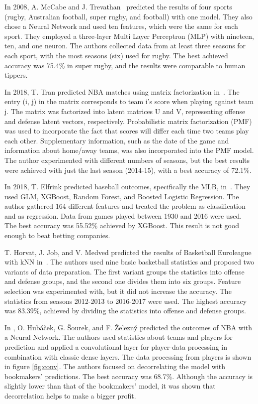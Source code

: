 \documentclass[thesis=M,english]{FITthesis}[2019/12/23]
\begin{document}
In 2008, A. McCabe and J. Trevathan~\cite{NN_more_sports} predicted the results of four sports (rugby, Australian football, super rugby, and football) with one model. They also chose a Neural Network and used ten features, which were the same for each sport. They employed a three-layer Multi Layer Perceptron (MLP) with nineteen, ten, and one neuron. The authors collected data from at least three seasons for each sport, with the most seasons (six) used for rugby. The best achieved accuracy was 75.4\% in super rugby, and the results were comparable to human tippers.

In 2018, T. Tran predicted NBA matches using matrix factorization in~\cite{NBA_matrix_factorization}. The entry (i, j) in the matrix corresponds to team i's score when playing against team j. The matrix was factorized into latent matrices U and V, representing offense and defense latent vectors, respectively. Probabilistic matrix factorization (PMF) was used to incorporate the fact that scores will differ each time two teams play each other. Supplementary information, such as the date of the game and information about home/away teams, was also incorporated into the PMF model. The author experimented with different numbers of seasons, but the best results were achieved with just the last season (2014-15), with a best accuracy of 72.1\%.

In 2018, T. Elfrink predicted baseball outcomes, specifically the MLB, in~\cite{MLB_regression}. They used GLM, XGBoost, Random Forest, and Boosted Logistic Regression. The author gathered 164 different features and treated the problem as classification and as regression. Data from games played between 1930 and 2016 were used. The best accuracy was 55.52\% achieved by XGBoost. This result is not good enough to beat betting companies.

T. Horvat, J. Job, and V. Medved predicted the results of Basketball Euroleague with kNN in~\cite{basketball_kNN}. The authors used nine basic basketball statistics and proposed two variants of data preparation. The first variant groups the statistics into offense and defense groups, and the second one divides them into six groups. Feature selection was experimented with, but it did not increase the accuracy. The statistics from seasons 2012-2013 to 2016-2017 were used. The highest accuracy was 83.39\%, achieved by dividing the statistics into offense and defense groups.

In \cite{NBA_convolution}, O. Hubáček, G. Šourek, and F. Železný predicted the outcomes of NBA with a Neural Network. The authors used statistics about teams and players for prediction and applied a convolutional layer for player-data processing in combination with classic dense layers. The data processing from players is shown in figure \ref{fig:conv}. The authors focused on decorrelating the model with bookmakers' predictions. The best accuracy was 68.7\%. Although the accuracy is slightly lower than that of the bookmakers' model, it was shown that decorrelation helps to make a bigger profit. 
\end{document}
